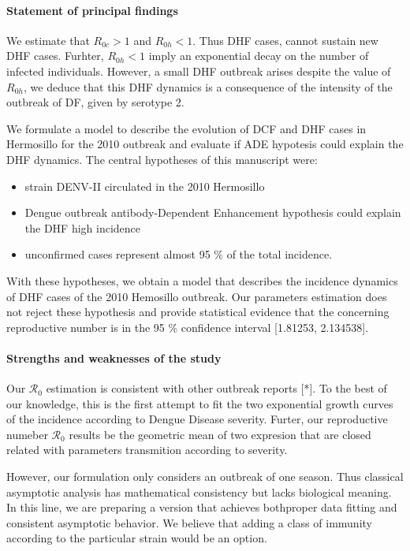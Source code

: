 \paragraph{Statement of principal findings}
    We estimate that $R_{0c}>1$ and  $R_{0h}<1$. Thus DHF cases, 
cannot sustain new DHF cases. Furhter, $R_{0h}<1$ imply an
exponential decay on the number of infected individuals. However,
a small DHF outbreak arises despite the value of $R_{0h}$, we deduce
that this DHF dynamics is a consequence of the
intensity of the outbreak of DF, given by serotype 2.

    We formulate a  model to describe the evolution of DCF and DHF
cases in Hermosillo for the 2010 outbreak and evaluate if ADE
hypotesis could explain the DHF dynamics. 
The central hypotheses of this manuscript were:
    \begin{itemize}
        \item
            strain DENV-II circulated in the 2010 Hermosillo 
        \item
            Dengue outbreak antibody-Dependent Enhancement hypothesis
            could explain the DHF high incidence 
        \item
            unconfirmed cases represent almost 95 \% of the total
            incidence.
    \end{itemize}
    With these hypotheses, we obtain a model that describes
the incidence dynamics of DHF cases of the 2010 Hemosillo outbreak.
Our parameters estimation does not reject these hypothesis and provide
statistical evidence that the concerning reproductive number is in the 
\num{95} \% confidence interval [\num{1.81253}, \num{2.134538}].

%
\paragraph{Strengths and weaknesses of the study} 
    Our $\mathcal{R}_0$ estimation is consistent with other outbreak reports [*].
To the best of our knowledge, this is the first attempt to fit the 
two exponential growth curves of the incidence according to Dengue 
Disease severity.  Furter, our reproductive numeber $\mathcal{R}_0$ 
results be the geometric mean of two expresion that are closed related 
with parameters transmition according to severity.  

    However, our formulation only considers an outbreak
of one season. Thus classical asymptotic analysis has mathematical 
consistency but lacks biological meaning.  In this line, we are preparing
a version that achieves both\textemdash proper data fitting and consistent
asymptotic behavior. We believe that adding a class of immunity according
to the particular strain would be an option.


